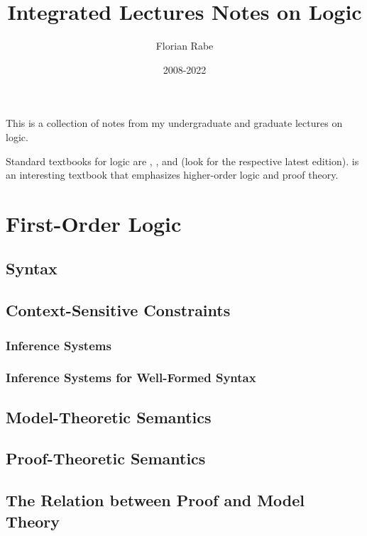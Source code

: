 \documentclass{book}
\title{Integrated Lectures Notes on Logic}
\author{Florian Rabe}
\date{2008-2022}
\begin{document}
\maketitle

\tableofcontents
\newpage

This is a collection of notes from my undergraduate and graduate lectures on logic.

Standard textbooks for logic are \cite{fol_gallier}, \cite{fol_smullyan}, and \cite{intrologicenderton} (look for the respective latest edition).
\cite{andrews_truthproof} is an interesting textbook that emphasizes higher-order logic and proof theory.

\part{First-Order Logic}\label{part:fol}

\chapter{Syntax}\label{sec:syn}
  
  
\chapter{Context-Sensitive Constraints}\label{sec:infsys}
  \section{Inference Systems}
     
  \section{Inference Systems for Well-Formed Syntax}
     

\chapter{Model-Theoretic Semantics}\label{sec:mt}
  

\chapter{Proof-Theoretic Semantics}\label{sec:pt}
  

\chapter{The Relation between Proof and Model Theory}
  
\end{document}
